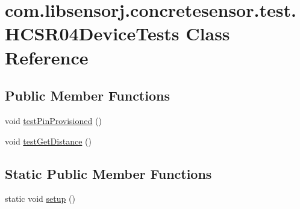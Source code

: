 \hypertarget{classcom_1_1libsensorj_1_1concretesensor_1_1test_1_1HCSR04DeviceTests}{}\section{com.\+libsensorj.\+concretesensor.\+test.\+H\+C\+S\+R04\+Device\+Tests Class Reference}
\label{classcom_1_1libsensorj_1_1concretesensor_1_1test_1_1HCSR04DeviceTests}
\subsection*{Public Member Functions}
\begin{DoxyCompactItemize}
\item 
void \hyperlink{classcom_1_1libsensorj_1_1concretesensor_1_1test_1_1HCSR04DeviceTests_aa4827ef25ecda9d8fafae51e1a26f44a}{test\+Pin\+Provisioned} ()
\item 
void \hyperlink{classcom_1_1libsensorj_1_1concretesensor_1_1test_1_1HCSR04DeviceTests_a8d5faee8a1e20b225c1f410e2bb51155}{test\+Get\+Distance} ()
\end{DoxyCompactItemize}
\subsection*{Static Public Member Functions}
\begin{DoxyCompactItemize}
\item 
static void \hyperlink{classcom_1_1libsensorj_1_1concretesensor_1_1test_1_1HCSR04DeviceTests_a03c2c422c08b49925990bc542e72020a}{setup} ()
\end{DoxyCompactItemize}
